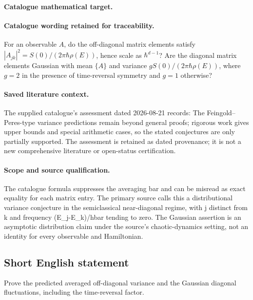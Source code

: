 \documentclass[11pt]{article}
\begin{document}
\paragraph{Catalogue mathematical target.}
\paragraph{Catalogue wording retained for traceability.}
For an observable $A$, do the off-diagonal matrix elements satisfy $|A_{jk}|^2=S(0)/(2\pi\hbar\rho(E))$, hence scale as $\hbar^{d-1}$? Are the diagonal matrix elements Gaussian with mean $\{A\}$ and variance $gS(0)/(2\pi\hbar\rho(E))$, where $g=2$ in the presence of time-reversal symmetry and $g=1$ otherwise?

\paragraph{Saved literature context.} The supplied catalogue's assessment dated 2026-08-21 records: The Feingold--Peres-type variance predictions remain beyond general proofs; rigorous work gives upper bounds and special arithmetic cases, so the stated conjectures are only partially supported. The assessment is retained as dated provenance; it is not a new comprehensive literature or open-status certification.
\paragraph{Scope and source qualification.}The catalogue formula suppresses the averaging bar and can be misread as exact equality for each matrix entry. The primary source calls this a distributional variance conjecture in the semiclassical near-diagonal regime, with j distinct from k and frequency (E_j-E_k)/hbar tending to zero. The Gaussian assertion is an asymptotic distribution claim under the source's chaotic-dynamics setting, not an identity for every observable and Hamiltonian.
\subsection{Short English statement}
Prove the predicted averaged off-diagonal variance and the Gaussian diagonal fluctuations, including the time-reversal factor.
\end{document}
